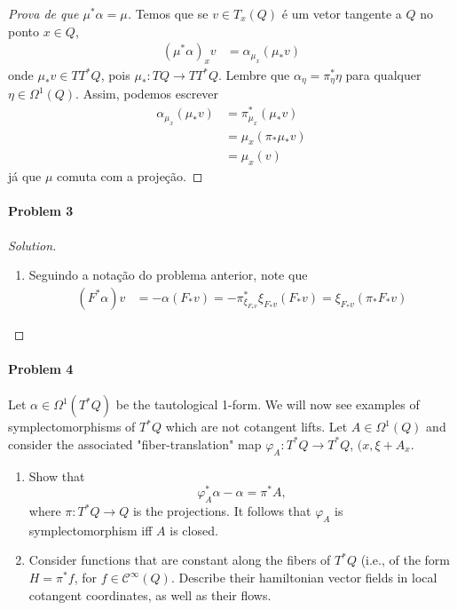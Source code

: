 \begin{proof}[Prova de que $\mu^*\alpha=\mu$]\leavevmode
	Temos que se $v\in T_x(Q)$ \'e um vetor tangente a $Q$ no ponto $x\in Q$,
	\begin{align*}
		(\mu^*\alpha)_xv&=\alpha_{\mu_x}(\mu_*v)
	\end{align*}
	onde $\mu_*v\in T T^*Q$, pois $\mu_*:TQ\to  T T^*Q$. Lembre que $\alpha_\eta=\pi^*_{\eta}\eta$ para qualquer $\eta\in\Omega^{1}(Q)$. Assim, podemos escrever
	\begin{align*}
		\alpha_{\mu_x}(\mu_*v)&=\pi_{\mu_x}^*(\mu_{*}v)\\
		& =\mu_x(\pi_{*}\mu_*v)\\
		&=\mu_x(v)
	\end{align*}
	j\'a que $\mu$ comuta com a proje\c c\~ao.
\end{proof}

\paragraph{Problem 3} 

\begin{proof}[Solution]\leavevmode
	\begin{enumerate}[label=\alph*.]
		\item Seguindo a nota\c c\~ao do problema anterior, note que
			\begin{align*}
			(F^*\alpha)v&=-\alpha(F_*v)=-\pi^*_{\xi_{F_*v}}\xi_{F_*v}(F_*v)=\xi_{F_*v}(\pi_*F_*v)
			\end{align*}
	\end{enumerate}
\end{proof}

\paragraph{Problem 4} Let $\alpha\in\Omega^{1}(T^*Q)$ be the tautological 1-form. We will now see examples of symplectomorphisms of $T^*Q$ which are not cotangent lifts. Let $A\in\Omega^{1}(Q)$ and consider the associated "fiber-translation" map $\varphi_A:T^*Q\to T^*Q$, $(x,\xi+A_x$.
\begin{enumerate}[label=\alph*.]
	\item Show that
		\[\varphi^*_A\alpha-\alpha=\pi^*A,\]
		where $\pi:T^*Q\to Q$ is the projections. It follows that $\varphi_A$ is symplectomorphism iff $A$ is closed.

	\item Consider functions that are constant along the fibers of $T^*Q$ (i.e., of the form $H=\pi^*f$, for $f\in\mathcal{C}^\infty(Q)$. Describe their hamiltonian vector fields in local cotangent coordinates, as well as their flows.
\end{enumerate}

